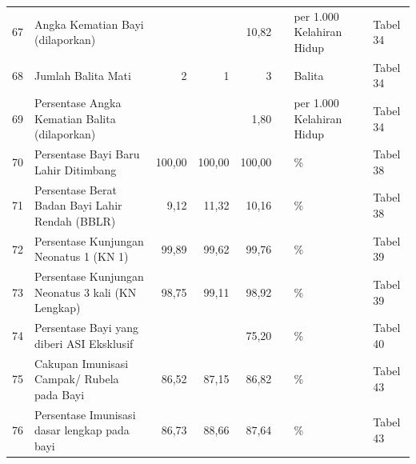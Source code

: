 \begin{small}
\begin{longtable}{rY{12em}rrrrY{5em}Y{5em}}
	 67 & Angka Kematian Bayi (dilaporkan)                                                                        &        &        &   10,82 &                    & per 1.000 Kelahiran Hidup      & Tabel 34 \\
	                   68 & Jumlah Balita Mati                                                                                      &      2 &      1 &       3 &                    & Balita                         & Tabel 34 \\
	 69 & Persentase Angka Kematian Balita (dilaporkan)                                                           &        &        &    1,80 &                    & per 1.000 Kelahiran Hidup      & Tabel 34 \\
	                   70 & Persentase Bayi Baru Lahir Ditimbang                                                                    & 100,00 & 100,00 &  100,00 &                    & \%                             & Tabel 38 \\
	 71 & Persentase Berat Badan Bayi Lahir Rendah (BBLR)                                                         &   9,12 &  11,32 &   10,16 &                    & \%                             & Tabel 38 \\
	                   72 & Persentase Kunjungan Neonatus 1 (KN 1)                                                                  &  99,89 &  99,62 &   99,76 &                    & \%                             & Tabel 39 \\
	 73 & Persentase Kunjungan Neonatus 3 kali (KN Lengkap)                                                       &  98,75 &  99,11 &   98,92 &                    & \%                             & Tabel 39 \\
	                   74 & Persentase Bayi yang diberi ASI Eksklusif                                                               &        &        &   75,20 &                    & \%                             & Tabel 40 \\
	 75 & Cakupan Imunisasi Campak/ Rubela pada Bayi                                                              &  86,52 &  87,15 &   86,82 &                    & \%                             & Tabel 43 \\
	                   76 & Persentase Imunisasi dasar lengkap pada bayi                                                            &  86,73 &  88,66 &   87,64 &                    & \%                             & Tabel 43 \\

\end{longtable}
\end{small}
